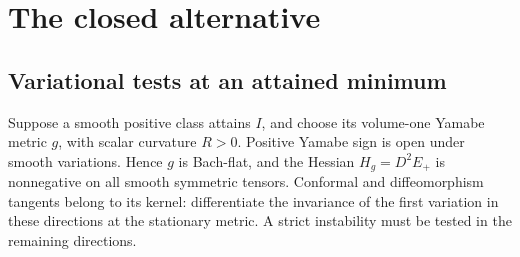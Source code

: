 \documentclass[11pt,letterpaper]{article}
\numberwithin{equation}{section}
\theoremstyle{remark}
\begin{document}



\section{The closed alternative}

\subsection{Variational tests at an attained minimum}

Suppose a smooth positive class attains \(I\), and choose its
volume-one Yamabe metric \(g\), with scalar curvature \(R>0\).
Positive Yamabe sign is open under smooth variations. Hence \(g\)
is Bach-flat, and the Hessian \(H_g=D^2E_+\) is nonnegative on
all smooth symmetric tensors. Conformal and diffeomorphism
tangents belong to its kernel: differentiate the invariance
of the first variation in these directions at the stationary
metric. A strict instability must be tested in the remaining
directions.
\end{document}
